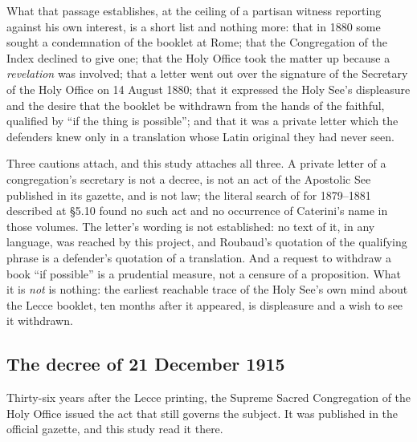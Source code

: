 What that passage establishes, at the ceiling of a partisan witness
reporting against his own interest, is a short list and nothing
more: that in 1880 some sought a condemnation of the booklet at
Rome; that the Congregation of the Index declined to give one; that
the Holy Office took the matter up because a \emph{revelation} was
involved; that a letter went out over the signature of the Secretary
of the Holy Office on 14 August 1880; that it expressed the Holy
See's displeasure and the desire that the booklet be withdrawn from
the hands of the faithful, qualified by ``if the thing is
possible''; and that it was a private letter which the defenders
knew only in a translation whose Latin original they had never seen.

Three cautions attach, and this study attaches all three. A private
letter of a congregation's secretary is not a decree, is not an act
of the Apostolic See published in its gazette, and is not law; the
literal search of  for 1879--1881 described
at \S5.10 found no such act and no occurrence of Caterini's name in
those volumes. The letter's wording is not established: no text of
it, in any language, was reached by this project, and Roubaud's
quotation of the qualifying phrase is a defender's quotation of a
translation. And a request to withdraw a book ``if possible'' is a
prudential measure, not a censure of a proposition. What it is
\emph{not} is nothing: the earliest reachable trace of the Holy
See's own mind about the Lecce booklet, ten months after it
appeared, is displeasure and a wish to see it withdrawn.

\subsection{The decree of 21 December 1915}

Thirty-six years after the Lecce printing, the Supreme Sacred
Congregation of the Holy Office issued the act that still governs
the subject. It was published in the official gazette, and this
study read it there.

